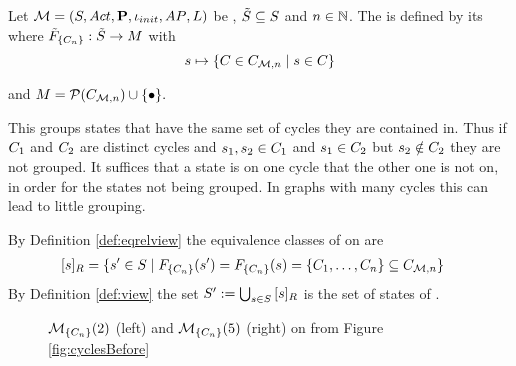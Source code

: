 \documentclass[preview]{standalone}
\begin{document}
\pagebreak

\begin{definition}
	Let ${{{\mathcal{M}}}} = {{({S}, {Act}, {\textbf{P}}, {\iota_{init}}, {AP}, {L})}}$ be \achgphN, ${\tilde{{S}}} \subseteq {S}$ and $n \in {\mathbb{N}}$. The \viewN \viewexactcycle is defined by its \grpfctN \gfctexactcycle where ${{\tilde{F}_{{\{{C}_n\}}}}} : {\tilde{{S}}} \to {\ensuremath{{M}}}$ with
	\[
	\state \mapsto \{\cycle \in \cycleset \mid \state \in \cycle\}
	\]
	
	and $\imggrp = \powerset{\cycleset}\cup \remset.$
	\label{def:exactcycleview}
\end{definition}

This \viewN groups states that have the same set of cycles they are contained in. Thus if ${C}_1$ and ${C}_2$ are distinct cycles and ${s}_1, {s}_2 \in {C}_1$ and ${s}_1 \in {C}_2$ but ${s}_2 \notin {C}_2$ they are not grouped. It suffices that a state is on one cycle that the other one is not on, in order for the states not being grouped. In graphs with many cycles this can lead to little grouping.

\noindent By Definition \ref{def:eqrelview} the equivalence classes of \eqrelview on \states are
\begin{align*}
	\eqclassv &= \{\state' \in \states \mid \gfctexactcycle(\state') = \gfctexactcycle(\state) = \{\cycle_1, \dots, \cycle_n\} \subseteq \cycleset\}
\end{align*}
\noindent By Definition \ref{def:view} the set ${S}' := \bigcup_{{s} \in {S}} {{[{s}]_{{R}}}}$ is the set of states of \viewexactcycle.


\begin{figure}[!htb]
	\begin{minipage}{.5\textwidth}
		
	\end{minipage}%
	\begin{minipage}{.5\textwidth}
		
	\end{minipage}
	\caption{\viewNC ${{{{{\mathcal{M}}}}_{{\{{C}_n\}}}}}(2)$ (left) and \viewN ${{{{{\mathcal{M}}}}_{{\{{C}_n\}}}}}(5)$ (right) on \chgph from Figure \ref{fig:cyclesBefore}}
	\label{fig:cycleAfterExtact} 
\end{figure}
\end{document}
